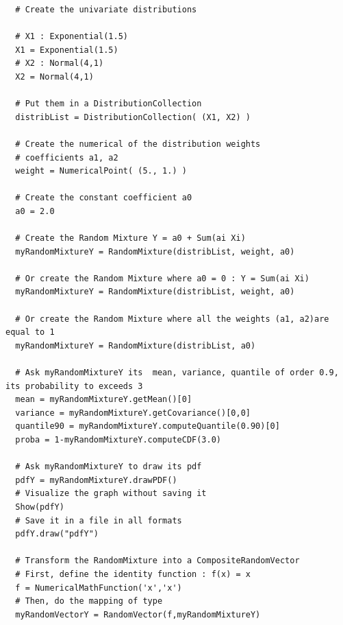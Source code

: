 \begin{lstlisting}
  # Create the univariate distributions

  # X1 : Exponential(1.5)
  X1 = Exponential(1.5)
  # X2 : Normal(4,1)
  X2 = Normal(4,1)

  # Put them in a DistributionCollection
  distribList = DistributionCollection( (X1, X2) )

  # Create the numerical of the distribution weights
  # coefficients a1, a2
  weight = NumericalPoint( (5., 1.) )

  # Create the constant coefficient a0
  a0 = 2.0

  # Create the Random Mixture Y = a0 + Sum(ai Xi)
  myRandomMixtureY = RandomMixture(distribList, weight, a0)

  # Or create the Random Mixture where a0 = 0 : Y = Sum(ai Xi)
  myRandomMixtureY = RandomMixture(distribList, weight, a0)

  # Or create the Random Mixture where all the weights (a1, a2)are equal to 1
  myRandomMixtureY = RandomMixture(distribList, a0)

  # Ask myRandomMixtureY its  mean, variance, quantile of order 0.9, its probability to exceeds 3
  mean = myRandomMixtureY.getMean()[0]
  variance = myRandomMixtureY.getCovariance()[0,0]
  quantile90 = myRandomMixtureY.computeQuantile(0.90)[0]
  proba = 1-myRandomMixtureY.computeCDF(3.0)

  # Ask myRandomMixtureY to draw its pdf
  pdfY = myRandomMixtureY.drawPDF()
  # Visualize the graph without saving it
  Show(pdfY)
  # Save it in a file in all formats
  pdfY.draw("pdfY")

  # Transform the RandomMixture into a CompositeRandomVector
  # First, define the identity function : f(x) = x  
  f = NumericalMathFunction('x','x')
  # Then, do the mapping of type
  myRandomVectorY = RandomVector(f,myRandomMixtureY)
\end{lstlisting}





